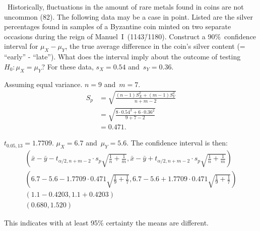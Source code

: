\begin{problem}
  ~Historically, fluctuations in the amount of rare metals found in coins are not uncommon (82). The following data may be a case in point. Listed are the silver percentages found in samples of a Byzantine coin minted on two separate occasions during the reign of Manuel~I~(1143\=/1180). Construct a 90\%~confidence interval for ${\mu_{X} - \mu_{Y}}$, the true average difference in the coin’s silver content (= ``early'' - ``late''). What does the interval imply about the outcome of testing ${H_0: \mu_{X} = \mu_{Y}}$? For these data, ${s_{X} = 0.54}$ and~${s_{Y} = 0.36}$.
\end{problem}

\noindent
Assuming equal variance. ${n = 9}$ and~${m = 7}$.
\begin{align}
  S_{p} &= \sqrt{\frac{(n-1)S^{2}_{X} + (m-1)S^{2}_{Y}}{n + m - 2}} \\
        &= \sqrt{\frac{8 \cdot 0.54^2 + 6 \cdot 0.36^2}{9 + 7 - 2}} \\
        &= 0.471\text{.}
\end{align}

\noindent
${t_{0.05,13} = 1.7709}$.  ${\mu_{X} = 6.7}$ and~${\mu_{Y} = 5.6}$. The confidence interval is then:
\begin{align}
  \left(\bar{x} - \bar{y} - t_{\alpha/2,n+m-2} \cdot s_p\sqrt{\frac{1}{n} + \frac{1}{m}},\bar{x} - \bar{y} + t_{\alpha/2,n+m-2} \cdot s_p\sqrt{\frac{1}{n} + \frac{1}{m}}\right) \\
  \left(6.7 - 5.6 - 1.7709 \cdot 0.471 \sqrt{\frac{1}{9} + \frac{1}{7}}, 6.7 - 5.6+ 1.7709 \cdot 0.471 \sqrt{\frac{1}{9} + \frac{1}{7}}\right) \\
  \left(1.1 - 0.4203, 1.1 + 0.4203\right) \\
  \left(0.680, 1.520\right)
\end{align}

This indicates with at least 95\% certainty the means are different.
